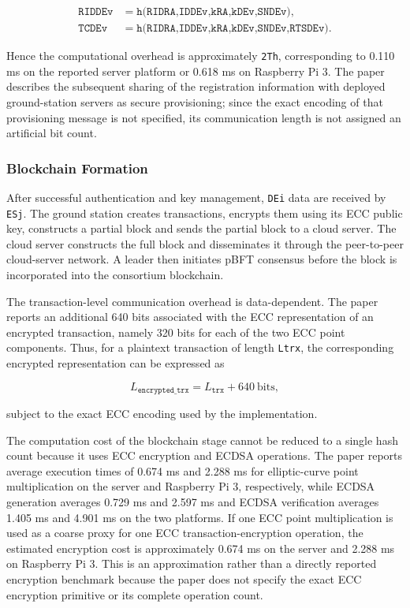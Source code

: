\begin{align}
\texttt{RIDDEv} &=
\texttt{h(RIDRA,IDDEv,kRA,kDEv,SNDEv)},\\
\texttt{TCDEv} &=
\texttt{h(RIDRA,IDDEv,kRA,kDEv,SNDEv,RTSDEv)}.
\end{align}

Hence the computational overhead is approximately \texttt{2Th}, corresponding
to 0.110 ms on the reported server platform or 0.618 ms on Raspberry Pi 3.
The paper describes the subsequent sharing of the registration information
with deployed ground-station servers as secure provisioning; since the exact
encoding of that provisioning message is not specified, its communication
length is not assigned an artificial bit count.

\subsubsection{Blockchain Formation}

After successful authentication and key management, \texttt{DEi} data are
received by \texttt{ESj}. The ground station creates transactions, encrypts
them using its ECC public key, constructs a partial block and sends the partial
block to a cloud server. The cloud server constructs the full block and
disseminates it through the peer-to-peer cloud-server network. A leader then
initiates pBFT consensus before the block is incorporated into the consortium
blockchain.

The transaction-level communication overhead is data-dependent. The paper
reports an additional 640 bits associated with the ECC representation of an
encrypted transaction, namely 320 bits for each of the two ECC point
components. Thus, for a plaintext transaction of length
\texttt{Ltrx}, the corresponding encrypted representation can be expressed as

\begin{equation}
L_{\texttt{encrypted\_trx}}
=
L_{\texttt{trx}}+640~\text{bits},
\end{equation}

subject to the exact ECC encoding used by the implementation.

The computation cost of the blockchain stage cannot be reduced to a single
hash count because it uses ECC encryption and ECDSA operations. The paper
reports average execution times of 0.674 ms and 2.288 ms for elliptic-curve
point multiplication on the server and Raspberry Pi 3, respectively, while
ECDSA generation averages 0.729 ms and 2.597 ms and ECDSA verification averages
1.405 ms and 4.901 ms on the two platforms. If one ECC point multiplication is
used as a coarse proxy for one ECC transaction-encryption operation, the
estimated encryption cost is approximately 0.674 ms on the server and
2.288 ms on Raspberry Pi 3. This is an approximation rather than a directly
reported encryption benchmark because the paper does not specify the exact
ECC encryption primitive or its complete operation count.

